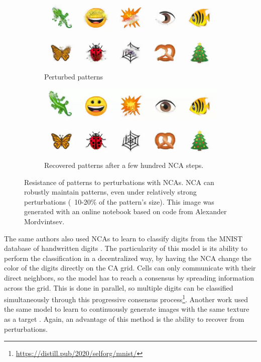 \begin{figure}[htbp]
  \centering
  \begin{subfigure}[t]{.49\linewidth}
    \centering
    \includegraphics[width=\linewidth]{figures/nca_perturb.png}
    \caption{Perturbed patterns}
    \label{fig:nca_perturb}
  \end{subfigure}
  \begin{subfigure}[t]{.49\linewidth}
    \centering
    \includegraphics[width=\linewidth]{figures/nca_recover.png}
    \caption{Recovered patterns after a few hundred \ac{NCA} steps.}
    \label{fig:nca_recover}
  \end{subfigure}
  \caption[Resistance of patterns]{Resistance of patterns to perturbations with
    \acp{NCA}. \ac{NCA} can robustly maintain patterns, even under relatively
    strong perturbations (~10-20\% of the pattern's size). This image was
    generated with an online notebook based on code from Alexander
    Mordvintsev\footnotemark.}
  \label{fig:nca}
\end{figure}

The same authors also used \acp{NCA} to learn to classify digits from the MNIST
database of handwritten digits
\parencite{randazzoSelfclassifyingMNISTDigits2020}. The particularity of this
model is its ability to perform the classification in a decentralized way, by
having the \ac{NCA} change the color of the digits directly on the \ac{CA} grid.
Cells can only communicate with their direct neighbors, so the model has to
reach a consensus by spreading information across the grid. This is done in
parallel, so multiple digits can be classified simultaneously through this
progressive consensus
process\footnote{\url{https://distill.pub/2020/selforg/mnist/}}.
Another work used the same model to learn to continuously generate images with
the same texture as a target \parencite{niklassonSelfOrganisingTextures2021}.
Again, an advantage of this method is the ability to recover from perturbations.

